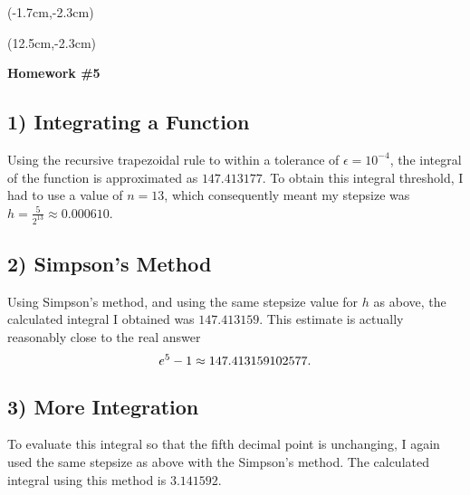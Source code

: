 \documentclass[12pt, oneside]{article}
\begin{document}
\begin{textblock*}{4cm}(-1.7cm,-2.3cm)
\end{textblock*}

\begin{textblock*}{8cm}(12.5cm,-2.3cm)
\end{textblock*}


\vspace{1cm}

\makeatletter
\setlength{\@fptop}{0pt}
\makeatother

\begin{center}
\textbf{\Large Homework \#5}
\end{center}


\subsection*{1) Integrating a Function}
Using the recursive trapezoidal rule to within a tolerance of $\epsilon=10^{-4} $, the integral of the function is approximated as $147.413177$. To obtain this integral threshold, I had to use a value of $n=13$, which consequently meant my stepsize was $h=\frac{5}{2^{13}}\approx0.000610$.


\subsection*{2) Simpson's Method}
Using Simpson's method, and using the same stepsize value for $h$ as above, the calculated integral I obtained was $147.413159$. This estimate is actually reasonably close to the real answer
\[e^5-1 \approx 147.413159102577\ldotp \]


\subsection*{3) More Integration}
To evaluate this integral so that the fifth decimal point is unchanging, I again used the same stepsize as above with the Simpson's method. The calculated integral using this method is $3.141592$.
\end{document}

